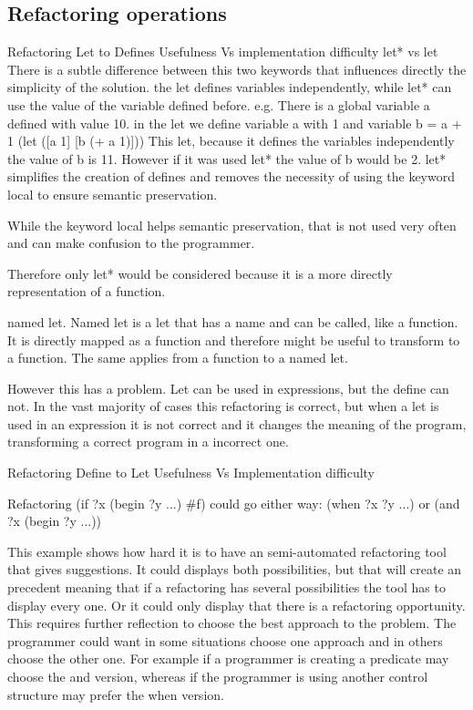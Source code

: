 \subsection{Refactoring operations}
Refactoring Let to Defines Usefulness Vs implementation difficulty
let* vs let
There is a subtle difference between this two keywords that influences directly the simplicity of the solution.
the let defines variables independently, while let* can use the value of the variable defined before.
e.g.
There is a global variable a defined with value 10.
in the let we define variable a with 1 and variable b = a + 1
(let ([a 1]
[b (+ a 1)]))
This let, because it defines the variables independently the value of b is 11.
However if it was used let* the value of b would be 2.
let* simplifies the creation of defines and removes the necessity of using the keyword local to ensure semantic preservation.

While the keyword local helps semantic preservation, that is not used very often and can make confusion to the programmer.

Therefore only let* would be considered because it is a more directly representation of a function.

named let.
Named let is a let that has a name and can be called, like a function.
It is directly mapped as a function and therefore might be useful to transform to a function.
The same applies from a function to a named let.

However this has a problem. Let can be used in expressions, but the define can not.
In the vast majority of cases this refactoring is correct, but when a let is used in an expression
it is not correct and it changes the meaning of the program, transforming a correct
program in a incorrect one.

Refactoring Define to Let Usefulness Vs Implementation difficulty

Refactoring (if ?x (begin ?y ...) \#f) could go either way:
(when ?x ?y ...)
or
(and ?x (begin ?y ...))

This example shows how hard it is to have an semi-automated refactoring tool
that gives suggestions. It could displays both possibilities, but that will
create an precedent meaning that if a refactoring has several possibilities the
tool has to display every one. Or it could only display that there is a
refactoring opportunity. This requires further reflection to choose the best
approach to the problem.
The programmer could want in some situations choose one approach and in others
choose the other one. For example if a programmer is creating a predicate may
choose the and version, whereas if the programmer is using another control structure
may prefer the when version.

